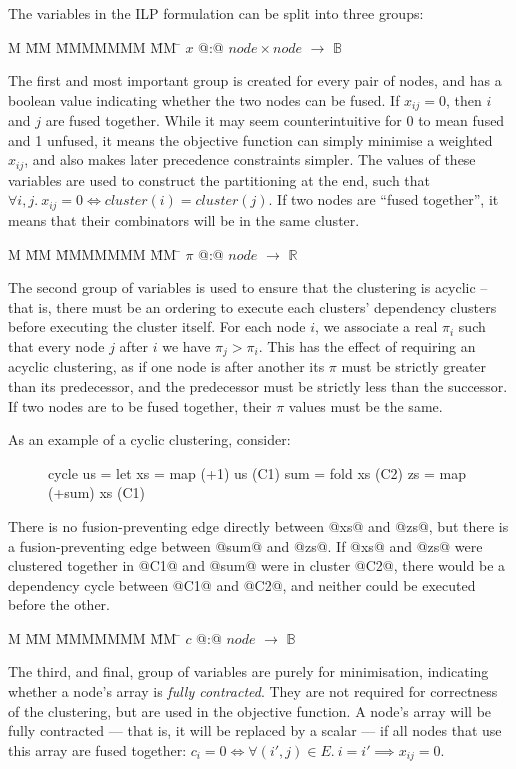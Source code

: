 The variables in the ILP formulation can be split into three groups:

\begin{tabbing}
M   \= MM \= MMMMMMM \= MM \= \kill
$x$   \> @:@  \> $node \times node$ \> $\to$ \> $\mathbb{B}$
\end{tabbing}
The first and most important group is created for every pair of nodes, and has a boolean value indicating whether the two nodes can be fused. If $x_{ij} = 0$, then $i$ and $j$ are fused together. While it may seem counterintuitive for 0 to mean fused and 1 unfused, it means the objective function can simply minimise a weighted $x_{ij}$, and also makes later precedence constraints simpler. The values of these variables are used to construct the partitioning at the end, such that $\forall i,j.\ x_{ij} = 0 \iff cluster(i) = cluster(j)$.
If two nodes are ``fused together'', it means that their combinators will be in the same cluster.

\begin{tabbing}
M   \= MM \= MMMMMMM \= MM \= \kill
$\pi$ \> @:@  \> $node$             \> $\to$ \> $\mathbb{R}$
\end{tabbing}
The second group of variables is used to ensure that the clustering is acyclic -- that is, there must be an ordering to execute each clusters' dependency clusters before executing the cluster itself.
For each node $i$, we associate a real $\pi_i$ such that every node $j$ after $i$ we have $\pi_j > \pi_i$. This has the effect of requiring an acyclic clustering, as if one node is after another its $\pi$ must be strictly greater than its predecessor, and the predecessor must be strictly less than the successor. If two nodes are to be fused together, their $\pi$ values must be the same.

As an example of a cyclic clustering, consider:
\begin{figure}[H]
\begin{code}
cycle us
 = let xs  = map (+1) us          (C1)
       sum = fold xs              (C2)
       zs  = map (+sum) xs        (C1)
\end{code}
\end{figure}
There is no fusion-preventing edge directly between @xs@ and @zs@, but there is a fusion-preventing edge between @sum@ and @zs@.
If @xs@ and @zs@ were clustered together in @C1@ and @sum@ were in cluster @C2@, there would be a dependency cycle between @C1@ and @C2@, and neither could be executed before the other.

\begin{tabbing}
M   \= MM \= MMMMMMM \= MM \= \kill
$c$   \> @:@  \> $node$             \> $\to$ \> $\mathbb{B}$
\end{tabbing}
The third, and final, group of variables are purely for minimisation, indicating whether a node's array is \emph{fully contracted}.
They are not required for correctness of the clustering, but are used in the objective function.
A node's array will be fully contracted --- that is, it will be replaced by a scalar --- if all nodes that use this array are fused together: $c_i = 0 \iff \forall (i',j) \in E.\ i = i' \implies x_{ij} = 0$.


